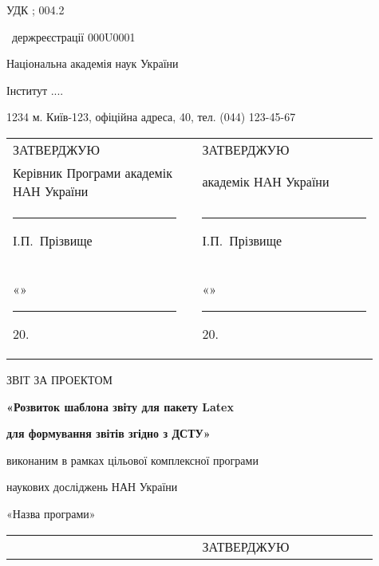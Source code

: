 \documentclass[a4paper,14pt]{extreport}
\begin{document}


\frontmatter %

\thispagestyle{empty}

\noindent УДК ; 004.2

\noindent \textnumero~держреєстрації 000U0001



 \begin{centering}
  \linespread{1.1}
  \vspace{1em}

{Національна академія наук України

Інститут ....

1234 м. Київ-123, офіційна адреса, 40, тел. (044) 123-45-67}

  \vspace{1em}
  
\begin{tabular}{p{0.45\linewidth}p{0.01\linewidth}p{0.45\linewidth}}
\noindent ЗАТВЕРДЖУЮ & & \noindent ЗАТВЕРДЖУЮ \\
Керівник Програми
академік НАН України 
& &
академік НАН України
\\

\rule{0.52\linewidth}{0pt}І.П.~Прізвище  & & \rule{0.52\linewidth}{0pt}І.П.~Прізвище\\

«\quad»\rule{0.35\linewidth}{0pt}20. & & «\quad»\rule{0.35\linewidth}{0pt}20.\\

\end{tabular}


  \vspace{0.5em}

ЗВІТ ЗА ПРОЕКТОМ

\textbf{«Розвиток шаблона звіту для пакету Latex}

\textbf{для формування звітів згідно з ДСТУ»}

виконаним в рамках цільової комплексної програми 

наукових досліджень НАН України

«Назва програми»

\begin{tabular}{p{0.45\linewidth}p{0.01\linewidth}p{0.45\linewidth}}
 & & \noindent ЗАТВЕРДЖУЮ \\


\end{tabular}
\end{centering}
\end{document}

